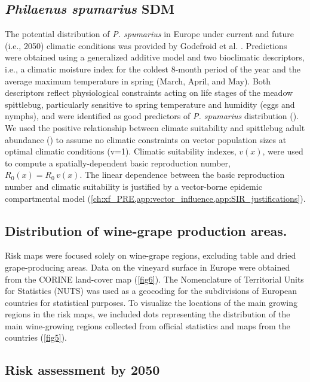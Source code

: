 \subsection{\textit{Philaenus spumarius} SDM}

The potential distribution of \textit{P. spumarius} in Europe under current and
future (i.e., 2050) climatic conditions was provided by Godefroid et al.
\cite{Godefroid2021}. Predictions were obtained using a generalized additive
model and two bioclimatic descriptors, i.e., a climatic moisture index for the
coldest 8-month period of the year and the average maximum temperature in
spring (March, April, and May). Both descriptors reflect physiological
constraints acting on life stages of the meadow spittlebug, particularly
sensitive to spring temperature and humidity (eggs and nymphs), and were
identified as good predictors of \textit{P. spumarius} distribution
(\cite{Godefroid2021}). We used the positive relationship between climate
suitability and spittlebug adult abundance (\cite{Godefroid2021}) to assume no
climatic constraints on vector population sizes at optimal climatic conditions
(v=1). Climatic suitability indexes, $v(x)$, were used to compute a
spatially-dependent basic reproduction number, $R_0(x)=R_0\, v(x)$. The linear
dependence between the basic reproduction number and climatic suitability is
justified by a vector-borne epidemic compartmental model
(\cref{ch:xf_PRE,app:vector_influence,app:SIR_justifications}).

\subsection{Distribution of wine-grape production areas.}
Risk maps were focused solely on wine-grape regions, excluding table and dried
grape-producing areas. Data on the vineyard surface in Europe were obtained
from the CORINE land-cover map \cite{Corine} (\cref{fig6}). The Nomenclature of
Territorial Units for Statistics (NUTS) was used as a geocoding for the
subdivisions of European countries for statistical purposes. To visualize the
locations of the main growing regions in the risk maps, we included dots
representing the distribution of the main wine-growing regions collected from
official statistics and maps from the countries (\cref{fig5}).

\subsection{Risk assessment by 2050}

